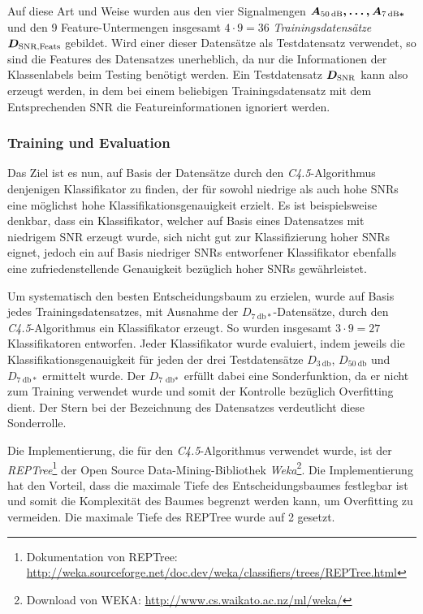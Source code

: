 Auf diese Art und Weise wurden aus den vier Signalmengen $\boldmath{A_{\SI{50}{\decibel}}}, \ldots , \boldmath{A_{\SI{7}{\decibel}*}}$ und den 9 Feature-Untermengen insgesamt $4 \cdot 9 = 36$ \emph{Trainingsdatensätze} $\boldmath{D_{\text{SNR,Feats}}}$ gebildet. Wird einer dieser Datensätze als Testdatensatz verwendet, so sind die Features des Datensatzes unerheblich, da nur die Informationen der Klassenlabels beim Testing benötigt werden. Ein Testdatensatz $\boldmath{D_{\text{SNR}}}$ kann also erzeugt werden, in dem bei einem beliebigen Trainingsdatensatz mit dem Entsprechenden SNR die Featureinformationen ignoriert werden.

\subsubsection{Training und Evaluation}
\label{sec:vad_training}

Das Ziel ist es nun, auf Basis der Datensätze durch den \emph{C4.5}-Algorithmus denjenigen Klassifikator zu finden, der für sowohl niedrige als auch hohe SNRs eine möglichst hohe Klassifikationsgenauigkeit erzielt. Es ist beispielsweise denkbar, dass ein Klassifikator, welcher auf Basis eines Datensatzes mit niedrigem SNR erzeugt wurde, sich nicht gut zur Klassifizierung hoher SNRs eignet, jedoch ein auf Basis niedriger SNRs entworfener Klassifikator ebenfalls eine zufriedenstellende Genauigkeit bezüglich hoher SNRs gewährleistet.

Um systematisch den besten Entscheidungsbaum zu erzielen, wurde auf Basis jedes Trainingsdatensatzes, mit Ausnahme der $D_{\SI{7}{\decibel}*}$-Datensätze, durch den \emph{C4.5}-Algorithmus ein Klassifikator erzeugt. So wurden insgesamt $3 \cdot 9 = 27$ Klassifikatoren entworfen. Jeder Klassifikator wurde evaluiert, indem jeweils die Klassifikationsgenauigkeit für jeden der drei Testdatensätze $D_{\SI{3}{\decibel}}$, $D_{\SI{50}{\decibel}}$ und $D_{\SI{7}{\decibel}*}$ ermittelt wurde. Der $D_{\SI{7}{\decibel*}}$ erfüllt dabei eine Sonderfunktion, da er nicht zum Training verwendet wurde und somit der Kontrolle bezüglich Overfitting dient. Der Stern bei der Bezeichnung des Datensatzes verdeutlicht diese Sonderrolle.

Die Implementierung, die für den \emph{C4.5}-Algorithmus verwendet wurde, ist der \emph{REPTree}\footnote{Dokumentation von REPTree: \url{http://weka.sourceforge.net/doc.dev/weka/classifiers/trees/REPTree.html}} der Open Source Data-Mining-Bibliothek \emph{Weka}\footnote{Download von WEKA: \url{http://www.cs.waikato.ac.nz/ml/weka/}}. Die Implementierung hat den Vorteil, dass die maximale Tiefe des Entscheidungsbaumes festlegbar ist und somit die Komplexität des Baumes begrenzt werden kann, um Overfitting zu vermeiden. Die maximale Tiefe des REPTree wurde auf 2 gesetzt. 

